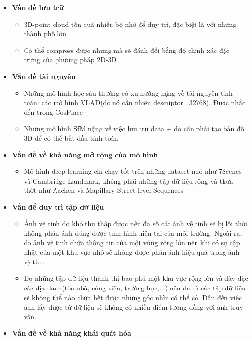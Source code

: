 \begin{itemize}
    \item \textbf{Vấn đề lưu trữ}
    \begin{itemize}
        \item 3D-point cloud tốn quá nhiều bộ nhớ để duy trì, đặc biệt là với những thành phố lớn
        \item Có thể compress được nhưng mà sẽ đánh đổi bằng độ chính xác đặc trưng của phương pháp 2D-3D
    \end{itemize}
    
    \item \textbf{Vẫn đề tài nguyên}
    \begin{itemize}
        \item Những mô hình học sâu thường có xu hướng nặng về tài nguyên tính toán: các mô hình VLAD(do nó cần nhiều descriptor ~32768). Được nhắc đến trong CosPlace
        \item Những mô hình SfM nặng về việc lưu trữ data + do cần phải tạo bản đồ 3D để có thể bắt đầu tính toán
    \end{itemize}
    \item \textbf{Vấn đề về khả năng mở rộng của mô hình}
    \begin{itemize}
        \item Mô hình deep learning chỉ chạy tốt trên những dataset nhỏ như 7Scenes và Cambridge Landmark, không phải những tập dữ liệu rộng và thưa thớt như Aachen và Mapillary Street-level Sequences
    \end{itemize}
    \item \textbf{Vấn để duy trì tập dữ liệu}
    \begin{itemize}
        \item Ảnh vệ tinh do khó thu thập được nên đa số các ảnh vệ tinh sẽ bị lỗi thời không phản ánh đúng được tình hình hiện tại của môi trường. Ngoài ra, do ảnh vệ tinh chứa thông tin của một vùng rộng lớn nên khi có sự cập nhật của một khu vực nhỏ sẽ không được phản ánh hiệu quả trong ảnh vệ tinh.
        \item Do những tập dữ liệu thành thị bao phủ một khu vực rộng lớn và dày đặc các địa danh(tòa nhà, công viên, trường học,...) nên đa số các tập dữ liệu sẽ không thể nào chứa hết được những góc nhìn có thể có. Dẫn đến việc ảnh lấy được từ dữ liệu sẽ không có nhiều điểm tương đồng với ảnh truy vấn.
    \end{itemize}
    \item \textbf{Vấn đề về khả năng khái quát hóa}
    \begin{itemize}

\end{itemize}
\end{itemize}
